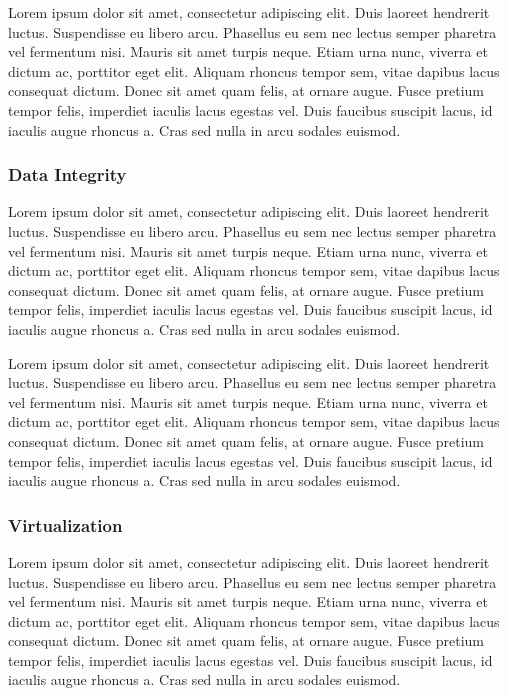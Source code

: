 \documentclass[final,conference,11pt]{IEEEtran}
\begin{document}
Lorem ipsum dolor sit amet, consectetur adipiscing elit. Duis laoreet hendrerit luctus. Suspendisse eu libero arcu. Phasellus eu sem nec lectus semper pharetra vel fermentum nisi. Mauris sit amet turpis neque. Etiam urna nunc, viverra et dictum ac, porttitor eget elit. Aliquam rhoncus tempor sem, vitae dapibus lacus consequat dictum. Donec sit amet quam felis, at ornare augue. Fusce pretium tempor felis, imperdiet iaculis lacus egestas vel. Duis faucibus suscipit lacus, id iaculis augue rhoncus a. Cras sed nulla in arcu sodales euismod.

\subsubsection{Data Integrity}
Lorem ipsum dolor sit amet, consectetur adipiscing elit. Duis laoreet hendrerit luctus. Suspendisse eu libero arcu. Phasellus eu sem nec lectus semper pharetra vel fermentum nisi. Mauris sit amet turpis neque. Etiam urna nunc, viverra et dictum ac, porttitor eget elit. Aliquam rhoncus tempor sem, vitae dapibus lacus consequat dictum. Donec sit amet quam felis, at ornare augue. Fusce pretium tempor felis, imperdiet iaculis lacus egestas vel. Duis faucibus suscipit lacus, id iaculis augue rhoncus a. Cras sed nulla in arcu sodales euismod.

Lorem ipsum dolor sit amet, consectetur adipiscing elit. Duis laoreet hendrerit luctus. Suspendisse eu libero arcu. Phasellus eu sem nec lectus semper pharetra vel fermentum nisi. Mauris sit amet turpis neque. Etiam urna nunc, viverra et dictum ac, porttitor eget elit. Aliquam rhoncus tempor sem, vitae dapibus lacus consequat dictum. Donec sit amet quam felis, at ornare augue. Fusce pretium tempor felis, imperdiet iaculis lacus egestas vel. Duis faucibus suscipit lacus, id iaculis augue rhoncus a. Cras sed nulla in arcu sodales euismod.

\subsubsection{Virtualization}
Lorem ipsum dolor sit amet, consectetur adipiscing elit. Duis laoreet hendrerit luctus. Suspendisse eu libero arcu. Phasellus eu sem nec lectus semper pharetra vel fermentum nisi. Mauris sit amet turpis neque. Etiam urna nunc, viverra et dictum ac, porttitor eget elit. Aliquam rhoncus tempor sem, vitae dapibus lacus consequat dictum. Donec sit amet quam felis, at ornare augue. Fusce pretium tempor felis, imperdiet iaculis lacus egestas vel. Duis faucibus suscipit lacus, id iaculis augue rhoncus a. Cras sed nulla in arcu sodales euismod.
\end{document}
